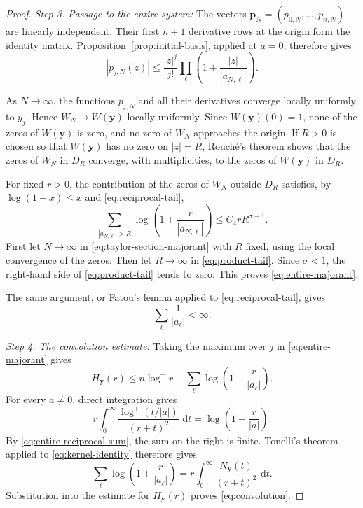 \documentclass[12pt,letterpaper,reqno]{amsart}
\theoremstyle{definition}
\numberwithin{equation}{section}
\newcommand{\dd}{\,\mathrm d}
\newcommand{\pv}{\bm p}
\newcommand{\yv}{\bm y}
\begin{document}
\begin{proof}
\medskip\noindent
\emph{{Step 3. Passage to the entire system:}}
The vectors \(\pv_N=(p_{0,N},\ldots,p_{n,N})\) are linearly
independent. Their first \(n+1\) derivative rows at the origin form the
identity matrix. Proposition~\ref{prop:initial-basis}, applied at
\(a=0\), therefore gives
\begin{equation}\label{eq:taylor-section-majorant}
 |p_{j,N}(z)|
 \leq
 \frac{|z|^j}{j!}
 \prod_\ell
 \left(1+\frac{|z|}{|a_{N,\ell}|}\right).
\end{equation}

As \(N\to\infty\), the functions \(p_{j,N}\) and all their derivatives
converge locally uniformly to \(y_j\). Hence \(W_N\to W(\yv)\) locally uniformly. Since \(W(\yv)(0)=1\), none of the zeros of \(W(\yv)\) is zero, and no zero of \(W_N\) approaches the origin. If \(R>0\) is chosen so that
\(W(\yv)\) has no zero on \(|z|=R\), Rouch\'e's theorem shows that the
zeros of \(W_N\) in \(D_R\) converge, with multiplicities, to the zeros
of \(W(\yv)\) in \(D_R\).

For fixed \(r>0\), the contribution of the zeros of \(W_N\) outside
\(D_R\) satisfies, by \(\log(1+x)\leq x\) and
\eqref{eq:reciprocal-tail},
\begin{equation}\label{eq:product-tail}
 \sum_{|a_{N,\ell}|>R}
 \log\left(1+\frac{r}{|a_{N,\ell}|}\right)
 \leq
 C_4rR^{\sigma-1}.
\end{equation}
First let \(N\to\infty\) in \eqref{eq:taylor-section-majorant} with
\(R\) fixed, using the local convergence of the zeros. Then let
\(R\to\infty\) in \eqref{eq:product-tail}. Since \(\sigma<1\), the
right-hand side of \eqref{eq:product-tail} tends to zero. This proves
\eqref{eq:entire-majorant}.

The same argument, or Fatou's lemma applied to
\eqref{eq:reciprocal-tail}, gives
\begin{equation}\label{eq:entire-reciprocal-sum}
 \sum_\ell\frac1{|a_\ell|}<\infty.
\end{equation}


\medskip\noindent
\emph{{Step 4. The convolution estimate:}}
Taking the maximum over \(j\) in \eqref{eq:entire-majorant} gives
\[
 H_{\yv}(r)
 \leq
 n\log^+r
 +
 \sum_\ell
 \log\left(1+\frac{r}{|a_\ell|}\right).
\]
For every \(a\ne0\), direct integration gives
\begin{equation}\label{eq:kernel-identity}
 r\int_0^\infty
 \frac{\log^+(t/|a|)}{(r+t)^2}\,\dd t
 =
 \log\left(1+\frac r{|a|}\right).
\end{equation}
By \eqref{eq:entire-reciprocal-sum}, the sum on the right is finite.
Tonelli's theorem \cite[Theorem~2.37(a), p.~67]{Fol99} applied to
\eqref{eq:kernel-identity} therefore gives
\[
 \sum_\ell
 \log\left(1+\frac r{|a_\ell|}\right)
 =
 r\int_0^\infty
 \frac{N_{\yv}(t)}{(r+t)^2}\,\dd t.
\]
Substitution into the estimate for \(H_{\yv}(r)\) proves
\eqref{eq:convolution}.
\end{proof}
\end{document}
